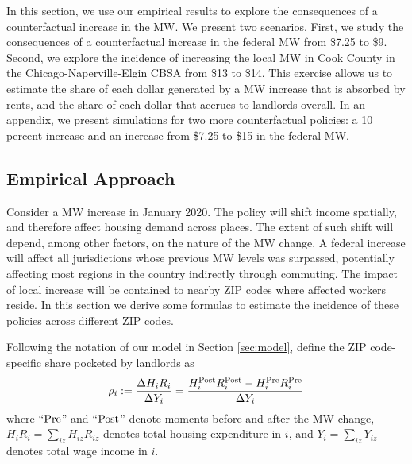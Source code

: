 
In this section, we use our empirical results to explore the consequences of 
a counterfactual increase in the MW. 
We present two scenarios.
First, we study the consequences of a counterfactual increase in the federal MW
from \$7.25 to \$9.
Second, we explore the incidence of increasing the local MW in Cook County in 
the Chicago-Naperville-Elgin CBSA from \$13 to \$14.
This exercise allows us to estimate the share of each dollar generated by a MW 
increase that is absorbed by rents, and the share of each dollar that accrues to
landlords overall.
In an appendix, we present simulations for two more counterfactual policies: 
a 10 percent increase and an increase from \$7.25 to \$15 in the federal MW.


\subsection{Empirical Approach}\label{sec:emp_cf}

Consider a MW increase in January 2020.
The policy will shift income spatially, and therefore affect housing demand
across places.
The extent of such shift will depend, among other factors, on the nature of the 
MW change.
A federal increase will affect all jurisdictions whose previous MW levels was 
surpassed, potentially affecting most regions in the country indirectly 
through commuting.
The impact of local increase will be contained to nearby ZIP codes where 
affected workers reside.
In this section we derive some formulas to estimate the incidence of these 
policies across different ZIP codes.

Following the notation of our model in Section \ref{sec:model}, define the 
ZIP code-specific share pocketed by landlords as
\begin{equation*}
    \rho_i := \frac{\Delta H_i R_i}{\Delta Y_i} 
            = \frac{H^{\text{Post}}_i R^{\text{Post}}_i - H^{\text{Pre}}_i R^{\text{Pre}}_i}{\Delta Y_i} 
\end{equation*}
where
``$\text{Pre}$'' and ``$\text{Post}$'' denote moments before and after the MW change,
$H_i R_i = \sum_{iz} H_{iz} R_{iz}$ denotes total housing expenditure in $i$, and
$Y_i = \sum_{iz} Y_{iz}$ denotes total wage income in $i$.

